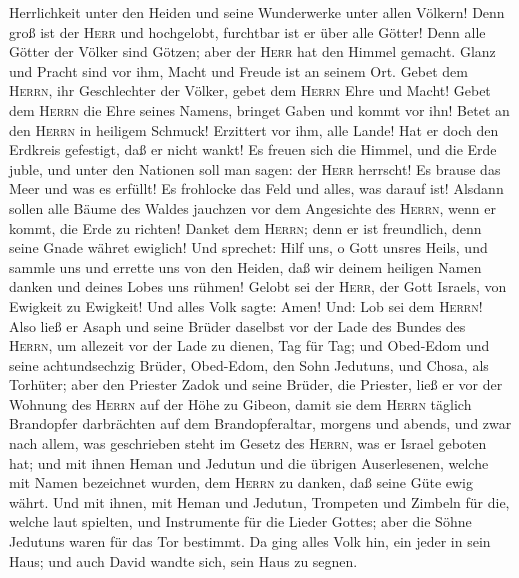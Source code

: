 Herrlichkeit unter den Heiden und seine Wunderwerke unter allen Völkern!
 Denn groß ist der \textsc{Herr} und hochgelobt,
furchtbar ist er über alle Götter!  Denn alle Götter der
Völker sind Götzen; aber der \textsc{Herr} hat den Himmel gemacht.
 Glanz und Pracht sind vor ihm, Macht und Freude ist an
seinem Ort.  Gebet dem \textsc{Herrn}, ihr Geschlechter
der Völker, gebet dem \textsc{Herrn} Ehre und Macht! 
Gebet dem \textsc{Herrn} die Ehre seines Namens, bringet Gaben und kommt
vor ihn! Betet an den \textsc{Herrn} in heiligem Schmuck!
 Erzittert vor ihm, alle Lande! Hat er doch den Erdkreis
gefestigt, daß er nicht wankt!  Es freuen sich die
Himmel, und die Erde juble, und unter den Nationen soll man sagen: der
\textsc{Herr} herrscht!  Es brause das Meer und was es
erfüllt! Es frohlocke das Feld und alles, was darauf ist!
 Alsdann sollen alle Bäume des Waldes jauchzen vor dem
Angesichte des \textsc{Herrn}, wenn er kommt, die Erde zu richten!
 Danket dem \textsc{Herrn}; denn er ist freundlich, denn
seine Gnade währet ewiglich!  Und sprechet: Hilf uns, o
Gott unsres Heils, und sammle uns und errette uns von den Heiden, daß
wir deinem heiligen Namen danken und deines Lobes uns rühmen!
 Gelobt sei der \textsc{Herr}, der Gott Israels, von
Ewigkeit zu Ewigkeit! Und alles Volk sagte: Amen! Und: Lob sei dem
\textsc{Herrn}!  Also ließ er Asaph und seine Brüder
daselbst vor der Lade des Bundes des \textsc{Herrn}, um allezeit vor der
Lade zu dienen, Tag für Tag;  und Obed-Edom und seine
achtundsechzig Brüder, Obed-Edom, den Sohn Jedutuns, und Chosa, als
Torhüter;  aber den Priester Zadok und seine Brüder, die
Priester, ließ er vor der Wohnung des \textsc{Herrn} auf der Höhe zu
Gibeon,  damit sie dem \textsc{Herrn} täglich Brandopfer
darbrächten auf dem Brandopferaltar, morgens und abends, und zwar nach
allem, was geschrieben steht im Gesetz des \textsc{Herrn}, was er Israel
geboten hat;  und mit ihnen Heman und Jedutun und die
übrigen Auserlesenen, welche mit Namen bezeichnet wurden, dem
\textsc{Herrn} zu danken, daß seine Güte ewig währt.  Und
mit ihnen, mit Heman und Jedutun, Trompeten und Zimbeln für die, welche
laut spielten, und Instrumente für die Lieder Gottes; aber die Söhne
Jedutuns waren für das Tor bestimmt.  Da ging alles Volk
hin, ein jeder in sein Haus; und auch David wandte sich, sein Haus zu
segnen.

